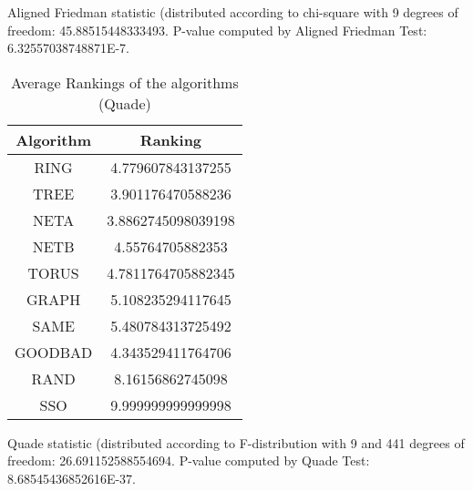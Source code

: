 \documentclass[a4paper,10pt]{article}
\begin{document}
\begin{landscape}
Aligned Friedman statistic (distributed according to chi-square with 9 degrees of freedom: 45.88515448333493. 
P-value computed by Aligned Friedman Test: 6.32557038748871E-7.\newline


\newpage

\begin{table}[!htp]
\centering
\caption{Average Rankings of the algorithms (Quade)
}\begin{tabular}{c|c}
Algorithm&Ranking\\
\hline
 RING&4.779607843137255\\
 TREE&3.901176470588236\\
 NETA&3.8862745098039198\\
 NETB&4.55764705882353\\
 TORUS&4.7811764705882345\\
 GRAPH&5.108235294117645\\
 SAME&5.480784313725492\\
 GOODBAD&4.343529411764706\\
 RAND&8.16156862745098\\
 SSO&9.999999999999998\\
\end{tabular}
\end{table}
Quade statistic (distributed according to F-distribution with 9 and 441 degrees of freedom: 26.691152588554694. 
P-value computed by Quade Test: 8.68545436852616E-37.\newline


\newpage


\end{landscape}
\end{document}
